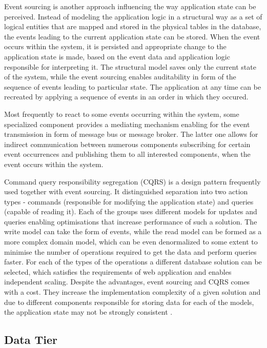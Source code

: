 Event sourcing is another approach influencing the way application state can be perceived. Instead of modeling the application logic in a structural way as a set of logical entities that are mapped and stored in the physical tables in the database, the events leading to the current application state can be stored. When the event occurs within the system, it is persisted and appropriate change to the application state is made, based on the event data and application logic responsible for interpreting it. The structural model saves only the current state of the system, while the event sourcing enables auditability in form of the sequence of events leading to particular state. The application at any time can be recreated by applying a sequence of events in an order in which they occured.

Most frequently to react to some events occurring within the system, some specialized component provides a mediating mechanism enabling for the event transmission in form of message bus or message broker. The latter one allows for indirect communication between numerous components subscribing for certain event occurrences and publishing them to all interested components, when the event occurs within the system.

Command query responsibility segregation (CQRS) is a design pattern frequently used together with event sourcing. It distinguished separation into two action types - commands (responsible for modifying the application state) and queries (capable of reading it). Each of the groups uses different models for updates and queries enabling optimisations that increase performance of such a solution. The write model can take the form of events, while the read model can be formed as a more complex domain model, which can be even denormalized to some extent to minimise the number of operations required to get the data and perform queries faster. For each of the types of the operations a different database solution can be selected, which satisfies the requirements of web application and enables independent scaling. Despite the advantages, event sourcing and CQRS comes with a cost. 
They increase the implementation complexity of a given solution and due to different components responsible for storing data for each of the models, the application state may not be strongly consistent \cite{MicroservicesArchitecture}.

\subsection*{Data Tier}

